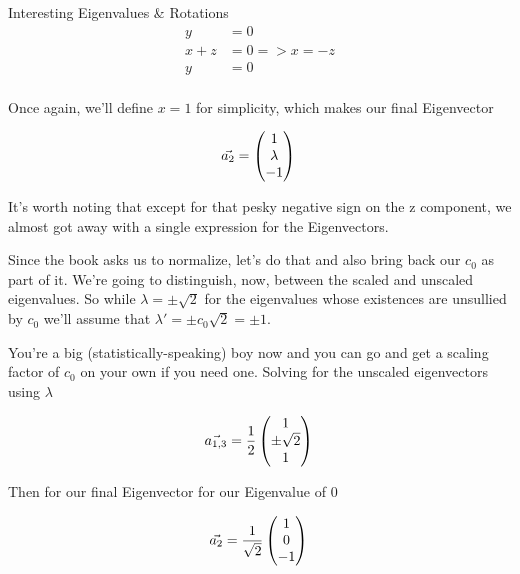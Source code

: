 \begin{answer}
\begin{answerpart}{Interesting Eigenvalues \& Rotations}
    \begin{equation}
      \begin{split}
        y &= 0\\
        x + z &= 0 => x = -z\\
        y &= 0\\
      \end{split}
    \end{equation}

    Once again, we'll define $x = 1$ for simplicity, which makes our
    final Eigenvector
    
    \begin{equation}
      \vec{a_2} = 
      \begin{pmatrix}
        1\\
        \lambda\\
        -1\\
      \end{pmatrix}\\
    \end{equation}

    It's worth noting that except for that pesky negative sign on the
    z component, we almost got away with a single expression for the
    Eigenvectors.

    Since the book asks us to normalize, let's do that and also bring
    back our $c_0$ as part of it.  We're going to distinguish, now,
    between the scaled and unscaled eigenvalues.  So while $\lambda =
    \pm \sqrt{2}$ for the eigenvalues whose existences are unsullied
    by $c_0$ we'll assume that $\lambda' = \pm c_0\sqrt{2} = \pm 1$.
    
    You're a big (statistically-speaking) boy now and you can go and
    get a scaling factor of $c_0$ on your own if you need one.
    Solving for the unscaled eigenvectors using $\lambda$

    \begin{equation}
      \vec{a_{1,3}} =
      \frac{1}{2}
      \begin{pmatrix}
        1\\
        \pm \sqrt{2}\\
        1\\
      \end{pmatrix}\\
    \end{equation}

    Then for our final Eigenvector for our Eigenvalue of $0$

    \begin{equation}
      \vec{a_{2}} =
      \frac{1}{\sqrt{2}}
      \begin{pmatrix}
        1\\
        0\\
        -1\\
      \end{pmatrix}\\
    \end{equation}
  \end{answerpart}


\end{answer}
